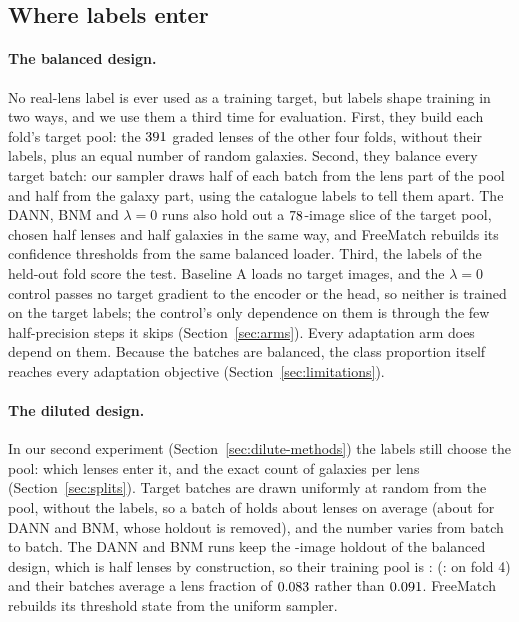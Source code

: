 \subsection{Where labels enter}
\label{sec:labels}

\paragraph{The balanced design.} No real-lens label is ever used as a training target, but
labels shape training in two ways, and we use them a third time for evaluation. First, they
build each fold's target pool: the
$391{}$ graded lenses of the other four folds, without their labels, plus an
equal number of random galaxies. Second, they balance every target batch: our sampler draws
half of each batch from the lens part of the pool and half from the galaxy part, using the
catalogue labels to tell them apart. The DANN, BNM and $\lambda=0$ runs also hold out a
$78{}$-image slice of the target pool, chosen half lenses and half galaxies in the
same way, and FreeMatch rebuilds its confidence thresholds from the same balanced loader.
Third, the labels of the held-out fold score the test. Baseline A loads no target images, and
the $\lambda=0$ control passes no target gradient to the encoder or the head, so neither is
trained on the target labels; the control's only dependence on them is through the few
half-precision steps it skips (Section~\ref{sec:arms}). Every adaptation arm does depend on
them. Because the batches are balanced, the class proportion itself reaches every
adaptation objective (Section~\ref{sec:limitations}).

\paragraph{The diluted design.} In our second experiment (Section~\ref{sec:dilute-methods}) the
labels still choose the pool: which \dlPoolLens{} lenses enter it, and the exact count of
\dlRatio{} galaxies per lens (Section~\ref{sec:splits}). Target batches are drawn uniformly at
random from the pool, without the labels, so a batch of \batchTargetRows{} holds about
\dlBatchLens{} lenses on average (about \dlBatchLensTrain{} for DANN and BNM, whose holdout is
removed), and the number varies from batch to batch. The DANN and BNM
runs keep the \dlHoldout{}-image holdout of the balanced design, which is half lenses by
construction, so their training pool is \dlTrainLens{}:\dlTrainGal{}
(\dlTrainLensFour{}:\dlTrainGalFour{} on fold 4) and their batches average a lens fraction of
$0.083{}$ rather than $0.091{}$. FreeMatch rebuilds its threshold state
from the uniform sampler.

